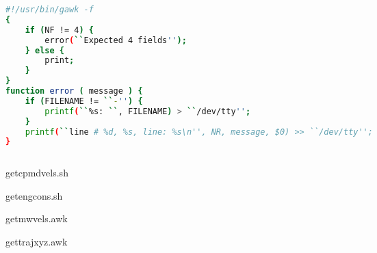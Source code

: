 \documentclass[10pt,t]{beamer}
\begin{document}
\begin{frame}
{\begin{itemize}
\begin{columns}
\begin{exampleblock}{}
          \begin{lstlisting}[language=bash]
#!/usr/bin/gawk -f
{
    if (NF != 4) {
        error(``Expected 4 fields'');
    } else {
        print;
    }
}
function error ( message ) {
    if (FILENAME != ``-'') {
        printf(``%s: ``, FILENAME) > ``/dev/tty'';
    }
    printf(``line # %d, %s, line: %s\n'', NR, message, $0) >> ``/dev/tty'';
}
          \end{lstlisting}
        \end{exampleblock}
      \end{columns}
  \end{itemize}
  }
\end{frame}

\begin{frame}%
  \begin{exampleblock}{getcpmdvels.sh}
    
  \end{exampleblock}
  \begin{exampleblock}{getengcons.sh}
    
  \end{exampleblock}
    
    \framebreak
  \begin{exampleblock}{getmwvels.awk}
    
  \end{exampleblock}
  \begin{exampleblock}{gettrajxyz.awk}
    
  \end{exampleblock}
\end{frame}
\end{document}
